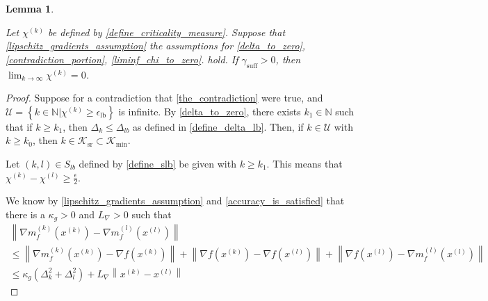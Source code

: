 \documentclass{article}
\newtheorem{lemma}[theorem]{Lemma}
\theoremstyle{case}
\numberwithin{theorem}{subsection}
\newcommand{\chik}{{\chi^{(k)}}}
\newcommand{\dk}{\Delta_k}
\newcommand{\dl}{\Delta_l}
\newcommand{\gammabi}{\gamma_{\textrm{suff}}}
\newcommand{\gammasm}{\gamma_{\textrm{min}}}
\newcommand{\gk}{{\nabla m_f^{(k)}\left(\xk\right)}}
\newcommand{\gl}{{\nabla m_f^{(l)}\left(\xl\right)}}
\newcommand{\gradf}{\nabla f}
\newcommand{\lipgrad}{{L_{\nabla}}}
\newcommand{\maxhessian}{{M_{\nabla^2}}}
\newcommand{\naturals}{\mathbb N}
\newcommand{\xk}{x^{(k)}}
\newcommand{\xl}{{x^{(l)}}}
\newcommand{\miniterates}{{\mathcal K_{\textrm{min}}}}
\newcommand{\reduceiterates}{{\mathcal K_{\textrm{sr}}}}
\begin{document}
\begin{lemma}
\label{lim_chi_to_zero}

Let $\chik$ be defined by \cref{define_criticality_measure}.
Suppose that 
\cref{lipschitz_gradients_assumption}
the assumptions for 
\cref{delta_to_zero},
\cref{contradiction_portion},
\cref{liminf_chi_to_zero}.
hold.
If $\gammabi > 0$, then $\lim_{k\to\infty}\chik=0$.
\end{lemma}


\begin{proof}
Suppose for a contradiction that \cref{the_contradiction} were true, and $\mathcal U = \left\{k \in \naturals | \chik \ge \epsilon_{\textrm{lb}} \right\}$ is infinite.
By \cref{delta_to_zero}, there exists $k_1 \in \naturals$ such that if $k \ge k_1$, then $\dk \le \Delta_{lb}$ as defined in \cref{define_delta_lb}.
Then, if $k \in \mathcal U$ with $k \ge k_0$, then $k \in \reduceiterates \subset \miniterates$.

Let $(k, l) \in S_{lb}$ defined by \cref{define_slb} be given with $k \ge k_1$.
This means that $\chik - \chi^{(l)} \ge \frac {\epsilon} 2 $.

We know by \cref{lipschitz_gradients_assumption} and \cref{accuracy_is_satisfied} that there is a $\kappa_g > 0$ and $\lipgrad>0$ such that
\begin{align}
\left\|\gk - \gl\right\| \nonumber \\
\le \left\|\gk - \gradf\left(\xk\right)\right\| 
+ \left\|\gradf\left(\xk\right) - \gradf\left(\xl\right)\right\| 
+ \left\|\gradf\left(\xl\right) - \gl \right\| \nonumber \\
\le \kappa_g \left(\dk^2 + \dl^2\right) + \lipgrad \left\|\xk - \xl \right\| \label{chi2zero2_comp1}
\end{align}


\end{proof}
\end{document}
